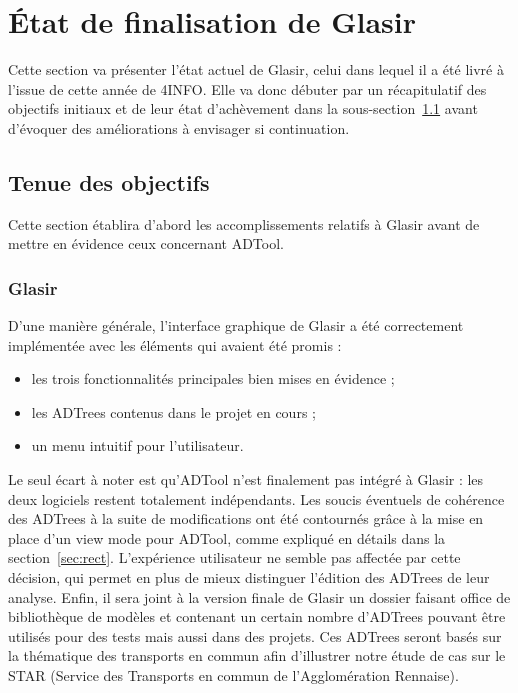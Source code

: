 \section{État de finalisation de Glasir}
\label{sec:etatFinal}

Cette section va présenter l'état actuel de Glasir, celui dans lequel il a été livré à l'issue de cette année de 4INFO. Elle va donc débuter par un récapitulatif des objectifs initiaux et de leur état d'achèvement dans la {\sc sous-section}~\ref{subsec:objOK} avant d'évoquer des améliorations à envisager si continuation.

\subsection{Tenue des objectifs}
\label{subsec:objOK}

Cette section établira d'abord les accomplissements relatifs à Glasir avant de mettre en évidence ceux concernant ADTool.

\subsubsection{Glasir}
\label{sssec:obj_glasir}

D'une manière générale, l'interface graphique de Glasir a été correctement implémentée avec les éléments qui avaient été promis : 
\begin{itemize}
	\item les trois fonctionnalités principales bien mises en évidence ;
	\item les ADTrees contenus dans le projet en cours ;
	\item un menu intuitif pour l'utilisateur.
\end{itemize}
Le seul écart à noter est qu'ADTool n'est finalement pas intégré à Glasir : les deux logiciels restent totalement indépendants. Les soucis éventuels de cohérence des ADTrees à la suite de modifications ont été contournés grâce à la mise en place d'un \og view mode \fg{} pour ADTool, comme expliqué en détails dans la {\sc section}~\ref{sec:rect}. L'expérience utilisateur ne semble pas affectée par cette décision, qui permet en plus de mieux distinguer l'édition des ADTrees de leur analyse. Enfin, il sera joint à la version finale de Glasir un dossier faisant office de bibliothèque de modèles et contenant un certain nombre d'ADTrees pouvant être utilisés pour des tests mais aussi dans des projets. Ces ADTrees seront basés sur la thématique des transports en commun afin d'illustrer notre étude de cas sur le STAR (Service des Transports en commun de l'Agglomération Rennaise).

